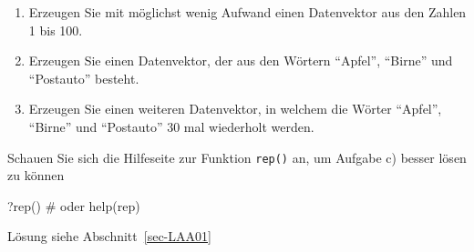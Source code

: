 \documentclass[
  11pt,
  a4paperpaper,
]{scrreprt}
\newenvironment{Shaded}{\begin{snugshade}}{\end{snugshade}}
\newcommand{\CommentTok}[1]{\textcolor[rgb]{0.37,0.37,0.37}{#1}}
\newcommand{\FunctionTok}[1]{\textcolor[rgb]{0.28,0.35,0.67}{#1}}
\newcommand{\NormalTok}[1]{\textcolor[rgb]{0.00,0.23,0.31}{#1}}
\begin{document}
\begin{tcolorbox}[enhanced jigsaw, arc=.35mm, breakable, left=2mm, opacityback=0, toprule=.15mm, bottomrule=.15mm, colback=white, colframe=quarto-callout-note-color-frame, leftrule=.75mm, rightrule=.15mm]
\begin{minipage}[t]{5.5mm}
\textcolor{quarto-callout-note-color}{\faInfo}
\end{minipage}%
\begin{minipage}[t]{\textwidth - 5.5mm}

\begin{enumerate}
\def\labelenumi{\alph{enumi})}
\item
  Erzeugen Sie mit möglichst wenig Aufwand einen Datenvektor aus den
  Zahlen 1 bis 100.
\item
  Erzeugen Sie einen Datenvektor, der aus den Wörtern ``Apfel'',
  ``Birne'' und ``Postauto'' besteht.
\item
  Erzeugen Sie einen weiteren Datenvektor, in welchem die Wörter
  ``Apfel'', ``Birne'' und ``Postauto'' 30 mal wiederholt werden.
\end{enumerate}

\begin{tcolorbox}[enhanced jigsaw, arc=.35mm, breakable, left=2mm, opacityback=0, toprule=.15mm, bottomrule=.15mm, colback=white, colframe=quarto-callout-caution-color-frame, leftrule=.75mm, rightrule=.15mm]
\begin{minipage}[t]{5.5mm}
\textcolor{quarto-callout-caution-color}{\faFire}
\end{minipage}%
\begin{minipage}[t]{\textwidth - 5.5mm}

Schauen Sie sich die Hilfeseite zur Funktion \texttt{rep()} an, um
Aufgabe c) besser lösen zu können

\begin{Shaded}
\begin{Highlighting}[]
\NormalTok{?}\FunctionTok{rep}\NormalTok{()}
\CommentTok{\# oder}
\FunctionTok{help}\NormalTok{(rep)}
\end{Highlighting}
\end{Shaded}

\end{minipage}%
\end{tcolorbox}

\end{minipage}%
\end{tcolorbox}

\begin{tcolorbox}[enhanced jigsaw, arc=.35mm, breakable, left=2mm, opacityback=0, toprule=.15mm, bottomrule=.15mm, colback=white, colframe=quarto-callout-tip-color-frame, leftrule=.75mm, rightrule=.15mm]
\begin{minipage}[t]{5.5mm}
\textcolor{quarto-callout-tip-color}{\faLightbulb}
\end{minipage}%
\begin{minipage}[t]{\textwidth - 5.5mm}

Lösung siehe Abschnitt~\ref{sec-LAA01}

\end{minipage}%
\end{tcolorbox}
\end{document}
